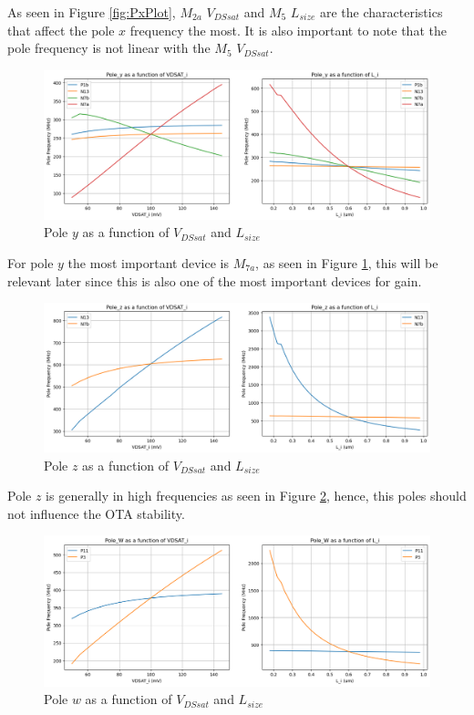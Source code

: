 As seen in Figure \ref{fig:PxPlot}, $M_{2a}$ $V_{DSsat}$ and $M_5$ $L_{size}$ are the characteristics that affect the pole $x$ frequency the most. It is also important to note that the pole frequency is not linear with the $M_5$ $V_{DSsat}$.  

\begin{figure}[H]
    \centering
    \includegraphics[width=1\textwidth]{Images/PyPlot.png}
    \caption{Pole $y$ as a function of $V_{DSsat}$ and $L_{size}$}
    \label{fig:PyPlot}
\end{figure}

For pole $y$ the most important device is $M_{7a}$, as seen in Figure \ref{fig:PyPlot}, this will be relevant later since this is also one of the most important devices for gain.

\begin{figure}[H]
    \centering
    \includegraphics[width=1\textwidth]{Images/PzPlot.png}
    \caption{Pole $z$ as a function of $V_{DSsat}$ and $L_{size}$}
    \label{fig:PzPlot}
\end{figure}

Pole $z$ is generally in high frequencies as seen in Figure \ref{fig:PzPlot}, hence, this poles should not influence the OTA stability.

\begin{figure}[H]
    \centering
    \includegraphics[width=1\textwidth]{Images/PwPlot.png}
    \caption{Pole $w$ as a function of $V_{DSsat}$ and $L_{size}$}
    \label{fig:PwPlot}
\end{figure}

